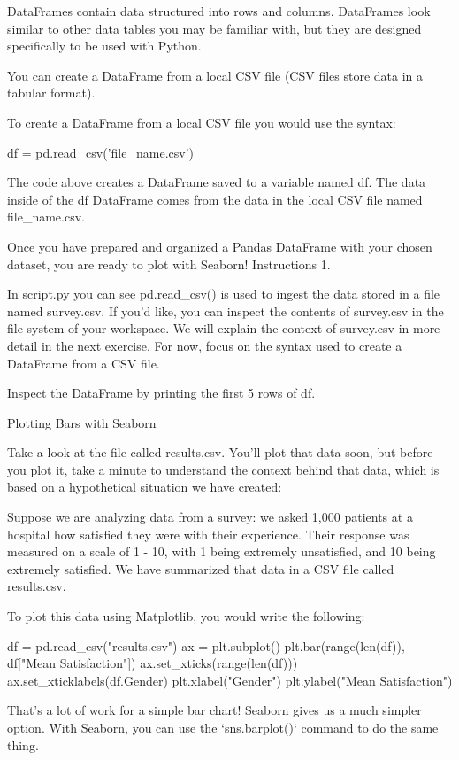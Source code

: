 \documentclass{journal}
\begin{document}
DataFrames contain data structured into rows and columns. DataFrames look similar to other data tables you may be familiar with, but they are designed specifically to be used with Python.

You can create a DataFrame from a local CSV file (CSV files store data in a tabular format).

To create a DataFrame from a local CSV file you would use the syntax:

df = pd.read_csv('file_name.csv')

The code above creates a DataFrame saved to a variable named df. The data inside of the df DataFrame comes from the data in the local CSV file named file_name.csv.

Once you have prepared and organized a Pandas DataFrame with your chosen dataset, you are ready to plot with Seaborn!
Instructions
1.

In script.py you can see pd.read_csv() is used to ingest the data stored in a file named survey.csv. If you’d like, you can inspect the contents of survey.csv in the file system of your workspace. We will explain the context of survey.csv in more detail in the next exercise. For now, focus on the syntax used to create a DataFrame from a CSV file.

Inspect the DataFrame by printing the first 5 rows of df.


Plotting Bars with Seaborn

Take a look at the file called results.csv. You’ll plot that data soon, but before you plot it, take a minute to understand the context behind that data, which is based on a hypothetical situation we have created:

Suppose we are analyzing data from a survey: we asked 1,000 patients at a hospital how satisfied they were with their experience. Their response was measured on a scale of 1 - 10, with 1 being extremely unsatisfied, and 10 being extremely satisfied. We have summarized that data in a CSV file called results.csv.

To plot this data using Matplotlib, you would write the following:

df = pd.read_csv("results.csv")
ax = plt.subplot()
plt.bar(range(len(df)),
        df["Mean Satisfaction"])
ax.set_xticks(range(len(df)))
ax.set_xticklabels(df.Gender)
plt.xlabel("Gender")
plt.ylabel("Mean Satisfaction")

That's a lot of work for a simple bar chart! Seaborn gives us a much simpler option. With Seaborn, you can use the `sns.barplot()` command to do the same thing.
\end{document}
